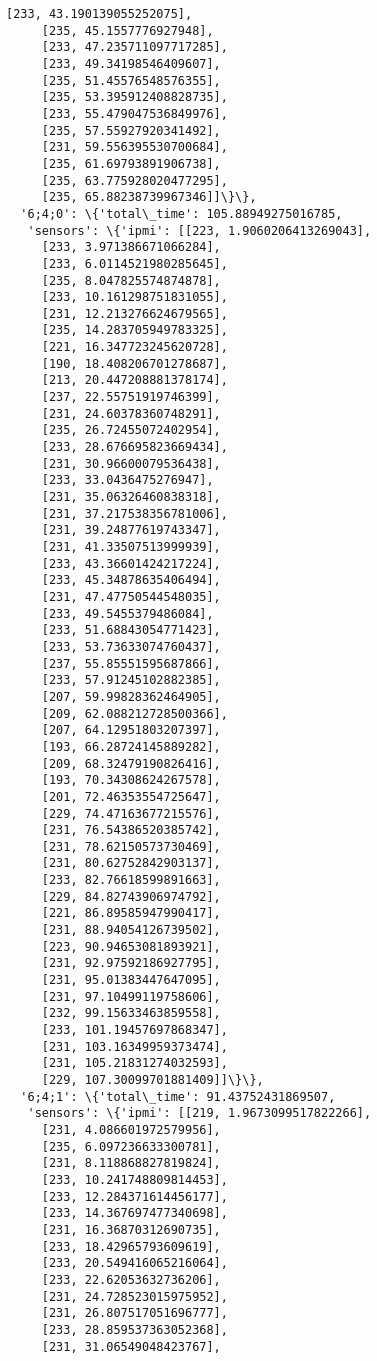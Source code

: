 \documentclass[11pt]{article}
\begin{document}
\begin{tcolorbox}[breakable, size=fbox, boxrule=.5pt, pad at break*=1mm, opacityfill=0]
\begin{Verbatim}[commandchars=\\\{\}]
     [233, 43.190139055252075],
     [235, 45.1557776927948],
     [233, 47.235711097717285],
     [233, 49.34198546409607],
     [235, 51.45576548576355],
     [235, 53.395912408828735],
     [233, 55.479047536849976],
     [235, 57.55927920341492],
     [231, 59.556395530700684],
     [235, 61.69793891906738],
     [235, 63.775928020477295],
     [235, 65.88238739967346]]\}\},
  '6;4;0': \{'total\_time': 105.88949275016785,
   'sensors': \{'ipmi': [[223, 1.9060206413269043],
     [233, 3.971386671066284],
     [233, 6.0114521980285645],
     [235, 8.047825574874878],
     [233, 10.161298751831055],
     [231, 12.213276624679565],
     [235, 14.283705949783325],
     [221, 16.347723245620728],
     [190, 18.408206701278687],
     [213, 20.447208881378174],
     [237, 22.55751919746399],
     [231, 24.60378360748291],
     [235, 26.72455072402954],
     [233, 28.676695823669434],
     [231, 30.96600079536438],
     [233, 33.0436475276947],
     [231, 35.06326460838318],
     [231, 37.217538356781006],
     [231, 39.24877619743347],
     [231, 41.33507513999939],
     [233, 43.36601424217224],
     [233, 45.34878635406494],
     [231, 47.47750544548035],
     [233, 49.5455379486084],
     [233, 51.68843054771423],
     [233, 53.73633074760437],
     [237, 55.85551595687866],
     [233, 57.91245102882385],
     [207, 59.99828362464905],
     [209, 62.088212728500366],
     [207, 64.12951803207397],
     [193, 66.28724145889282],
     [209, 68.32479190826416],
     [193, 70.34308624267578],
     [201, 72.46353554725647],
     [229, 74.47163677215576],
     [231, 76.54386520385742],
     [231, 78.62150573730469],
     [231, 80.62752842903137],
     [233, 82.76618599891663],
     [229, 84.82743906974792],
     [221, 86.89585947990417],
     [231, 88.94054126739502],
     [223, 90.94653081893921],
     [231, 92.97592186927795],
     [231, 95.01383447647095],
     [231, 97.10499119758606],
     [232, 99.15633463859558],
     [233, 101.19457697868347],
     [231, 103.16349959373474],
     [231, 105.21831274032593],
     [229, 107.30099701881409]]\}\},
  '6;4;1': \{'total\_time': 91.43752431869507,
   'sensors': \{'ipmi': [[219, 1.9673099517822266],
     [231, 4.086601972579956],
     [235, 6.097236633300781],
     [231, 8.118868827819824],
     [233, 10.241748809814453],
     [233, 12.284371614456177],
     [233, 14.367697477340698],
     [231, 16.36870312690735],
     [233, 18.42965793609619],
     [233, 20.549416065216064],
     [233, 22.62053632736206],
     [231, 24.728523015975952],
     [231, 26.807517051696777],
     [233, 28.859537363052368],
     [231, 31.06549048423767],

\end{Verbatim}
\end{tcolorbox}
\end{document}
